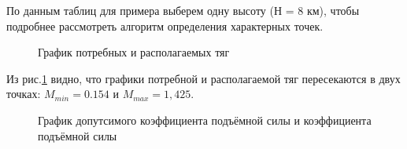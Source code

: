 








По данным таблиц для примера выберем одну высоту (Н = 8 км), чтобы подробнее рассмотреть алгоритм определения характерных точек.

\begin{figure}[H]
    \caption{График потребных и располагаемых тяг}
    \label{fig:График потребныйх и распологаемых тяг}
\end{figure}

Из рис.\ref{fig:График потребныйх и распологаемых тяг} видно, что графики потребной и располагаемой тяг пересекаются в двух точках: $M_{min} = 0.154$ и $M_{max} = 1,425$.

\begin{figure}[H]
    \caption{График допутсимого коэффициента подъёмной силы и коэффициента подъёмной силы}
    \label{fig:График допутсимого коэффициента подъёмной силы и коэффициента подъёмной силы}
\end{figure}

